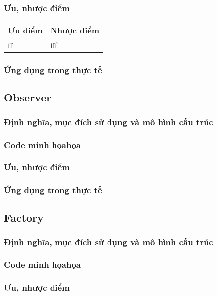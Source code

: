 \documentclass[14pt]{article}
\begin{document}
\subsubsection{ Ưu, nhược điểm}
\begin{table}[]
\begin{tabular}{|l|l|}
\hline
Ưu điểm & Nhược điểm \\ \hline
     ff   &      fff      \\ \hline
\end{tabular}
\end{table}
\subsubsection{ Ứng dụng trong thực tế}

\subsection{Observer}
\subsubsection{ Định nghĩa, mục đích sử dụng và mô hình cấu trúc}

\subsubsection{ Code minh họahọa}
\subsubsection{ Ưu, nhược điểm}
\subsubsection{ Ứng dụng trong thực tế}

\subsection{Factory}
\subsubsection{ Định nghĩa, mục đích sử dụng và mô hình cấu trúc}
\subsubsection{ Code minh họahọa}
\subsubsection{ Ưu, nhược điểm}
\end{document}
